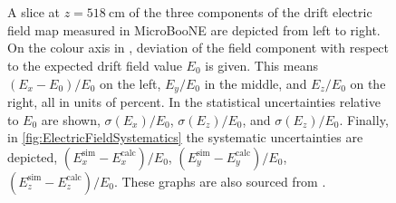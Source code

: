 \begin{figure}[htbp]
    \centering
     \\
    \\
    \caption[Measured Drift Electric Field in MicroBooNE Using the LCS]{A slice at $z=\SI{518}{\centi\metre}$ of the three components of the drift electric field map measured in MicroBooNE are depicted from left to right. On the colour axis in , deviation of the field component with respect to the expected drift field value $E_0$ is given. This means $(E_x-E_0)/E_0$ on the left, $E_y/E_0$ in the middle, and $E_z/E_0$ on the right, all in units of percent. In  the statistical uncertainties relative to $E_0$ are shown, \ie $\sigma(E_x)/E_0$, $\sigma(E_z)/E_0$, and $\sigma(E_z)/E_0$. Finally, in \ref{fig:ElectricFieldSystematics} the systematic uncertainties are depicted, \ie $(E_x^{\text{sim}} - E_x^{\text{calc}})/E_0$, $(E_y^{\text{sim}} - E_y^{\text{calc}})/E_0$, $(E_z^{\text{sim}} - E_z^{\text{calc}})/E_0$. These graphs are also sourced from \cite{LArLaserMicroBooNE2,LArLaserPhDYifan}.}
    \label{fig:LCSFieldMaps}
\end{figure}
